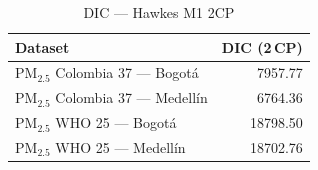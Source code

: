 \begin{table}[htbp]
\centering
\caption{DIC --- Hawkes M1 2CP}
\label{tab:hawkes_dic_2cp}
\begin{tabular}{lr}
\toprule
Dataset & DIC (2\,CP) \\
\midrule
PM$_{2.5}$ Colombia 37 --- Bogot\'{a} & 7957.77 \\
PM$_{2.5}$ Colombia 37 --- Medell\'{i}n & 6764.36 \\
PM$_{2.5}$ WHO 25 --- Bogot\'{a} & 18798.50 \\
PM$_{2.5}$ WHO 25 --- Medell\'{i}n & 18702.76 \\
\bottomrule
\end{tabular}
\end{table}
